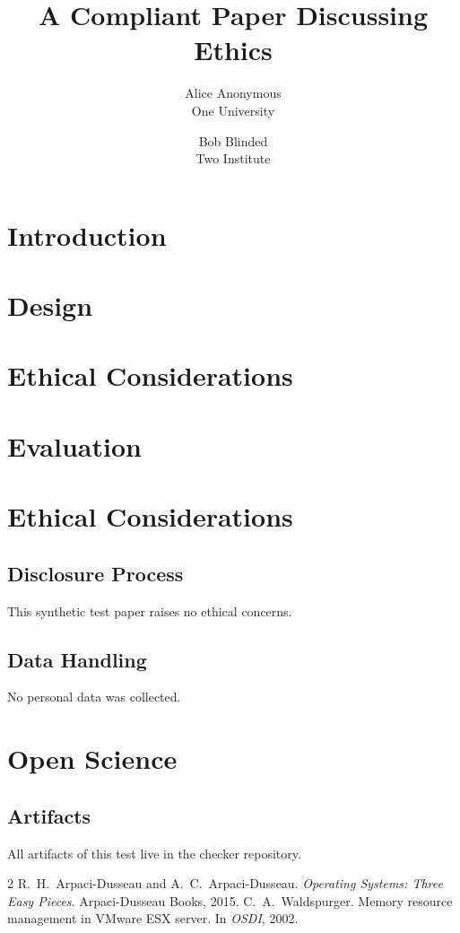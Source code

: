 \documentclass[letterpaper,twocolumn,10pt]{article}
\date{}
\title{\Large \bf A Compliant Paper Discussing Ethics}
\author{{\rm Alice Anonymous}\\One University \and {\rm Bob Blinded}\\Two Institute}
\begin{document}
\maketitle

\begin{abstract}
\lipsum[1][1-5]
\end{abstract}

\section{Introduction}
\lipsum[2-4]

\section{Design}
\lipsum[5-7]

\section{Ethical Considerations}
\lipsum[7][1-4]

\section{Evaluation}
\lipsum[8-9]

\section{Ethical Considerations}
\subsection{Disclosure Process}
This synthetic test paper raises no ethical concerns.
\subsection{Data Handling}
No personal data was collected.

\section{Open Science}
\subsection{Artifacts}
All artifacts of this test live in the checker repository.

\begin{thebibliography}{2}
 R.~H.\ Arpaci-Dusseau and A.~C.\ Arpaci-Dusseau.
  \emph{Operating Systems: Three Easy Pieces}. Arpaci-Dusseau Books, 2015.
 C.~A.\ Waldspurger. Memory resource management in VMware ESX
  server. In \emph{OSDI}, 2002.
\end{thebibliography}
\end{document}
